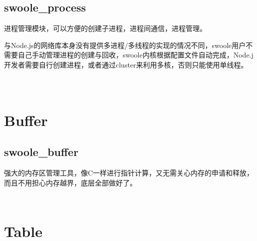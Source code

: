 \section{swoole\_process}

进程管理模块，可以方便的创建子进程，进程间通信，进程管理。

与Node.js的网络库本身没有提供多进程/多线程的实现的情况不同，swoole用户不需要自己手动管理进程的创建与回收，swoole内核根据配置文件自动完成，Node.j开发者需要自行创建进程，或者通过cluster来利用多核，否则只能使用单线程。






\begin{lstlisting}[language=bash]

\end{lstlisting}




\begin{lstlisting}[language=bash]

\end{lstlisting}




\begin{lstlisting}[language=bash]

\end{lstlisting}

\chapter{Buffer}



\section{swoole\_buffer}

强大的内存区管理工具，像C一样进行指针计算，又无需关心内存的申请和释放，而且不用担心内存越界，底层全部做好了。

\begin{lstlisting}[language=bash]

\end{lstlisting}




\begin{lstlisting}[language=bash]

\end{lstlisting}






\chapter{Table}



